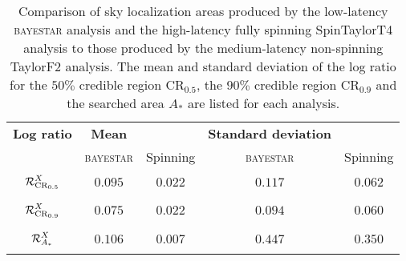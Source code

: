 \begin{table}
\begin{tabular}{ccccc}
\textbf{Log ratio} & \textbf{Mean} & & \textbf{Standard deviation} & \\   
 & \textsc{bayestar} & Spinning & \textsc{bayestar} & Spinning \\
$\displaystyle \vphantom{\frac{0}{0}} \mathcal{R}^X_{\mathrm{CR}_{0.5}}$ & $0.095$ & $0.022$ & $0.117$ & $0.062$ \\
$\displaystyle \vphantom{\frac{0}{0}} \mathcal{R}^X_{\mathrm{CR}_{0.9}}$ & $0.075$ & $0.022$ & $0.094$ & $0.060$ \\
$\displaystyle \vphantom{\frac{0}{0}} \mathcal{R}^X_{A_\ast}$ & $0.106$ & $0.007$ & $0.447$ & $0.350$
\end{tabular}
\label{tab:sky-ratio} \caption{Comparison of sky localization areas produced by the low-latency \textsc{bayestar} analysis and the high-latency fully spinning SpinTaylorT4 analysis to those produced by the medium-latency non-spinning TaylorF2 analysis. The mean and standard deviation of the log ratio for the $50\%$ credible region $\mathrm{CR}_{0.5}$, the $90\%$ credible region $\mathrm{CR}_{0.9}$ and the searched area $A_\ast$ are listed for each analysis.}

\end{table}
  
  
  
